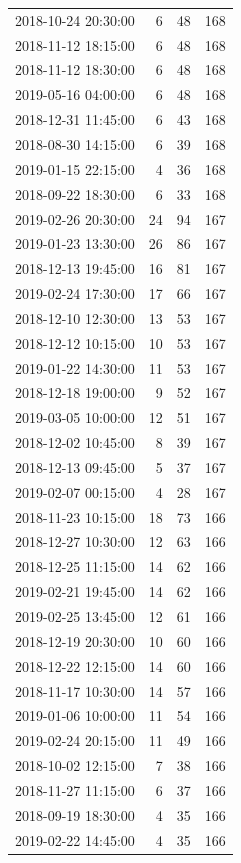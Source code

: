 \begin{tabular}{lrrr}
2018-10-24 20:30:00 & 6 & 48 & 168 \\
2018-11-12 18:15:00 & 6 & 48 & 168 \\
2018-11-12 18:30:00 & 6 & 48 & 168 \\
2019-05-16 04:00:00 & 6 & 48 & 168 \\
2018-12-31 11:45:00 & 6 & 43 & 168 \\
2018-08-30 14:15:00 & 6 & 39 & 168 \\
2019-01-15 22:15:00 & 4 & 36 & 168 \\
2018-09-22 18:30:00 & 6 & 33 & 168 \\
2019-02-26 20:30:00 & 24 & 94 & 167 \\
2019-01-23 13:30:00 & 26 & 86 & 167 \\
2018-12-13 19:45:00 & 16 & 81 & 167 \\
2019-02-24 17:30:00 & 17 & 66 & 167 \\
2018-12-10 12:30:00 & 13 & 53 & 167 \\
2018-12-12 10:15:00 & 10 & 53 & 167 \\
2019-01-22 14:30:00 & 11 & 53 & 167 \\
2018-12-18 19:00:00 & 9 & 52 & 167 \\
2019-03-05 10:00:00 & 12 & 51 & 167 \\
2018-12-02 10:45:00 & 8 & 39 & 167 \\
2018-12-13 09:45:00 & 5 & 37 & 167 \\
2019-02-07 00:15:00 & 4 & 28 & 167 \\
2018-11-23 10:15:00 & 18 & 73 & 166 \\
2018-12-27 10:30:00 & 12 & 63 & 166 \\
2018-12-25 11:15:00 & 14 & 62 & 166 \\
2019-02-21 19:45:00 & 14 & 62 & 166 \\
2019-02-25 13:45:00 & 12 & 61 & 166 \\
2018-12-19 20:30:00 & 10 & 60 & 166 \\
2018-12-22 12:15:00 & 14 & 60 & 166 \\
2018-11-17 10:30:00 & 14 & 57 & 166 \\
2019-01-06 10:00:00 & 11 & 54 & 166 \\
2019-02-24 20:15:00 & 11 & 49 & 166 \\
2018-10-02 12:15:00 & 7 & 38 & 166 \\
2018-11-27 11:15:00 & 6 & 37 & 166 \\
2018-09-19 18:30:00 & 4 & 35 & 166 \\
2019-02-22 14:45:00 & 4 & 35 & 166 \\

\end{tabular}
